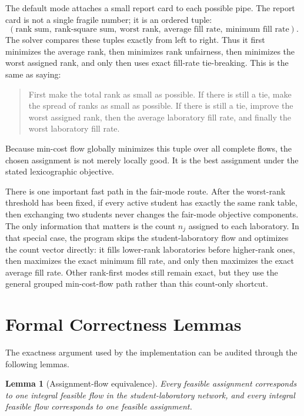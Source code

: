 \documentclass[11pt,a4paper]{article}
\newtheorem{lemma}{Lemma}
\begin{document}
The default mode attaches a small report card to each possible pipe.  The
report card is not a single fragile number; it is an ordered tuple:
\[
  (\text{rank sum},\ \text{rank-square sum},\ \text{worst rank},
  \ \text{average fill rate},\ \text{minimum fill rate}).
\]
The solver compares these tuples exactly from left to right.  Thus it first
minimizes the average rank, then minimizes rank unfairness, then minimizes the
worst assigned rank, and only then uses exact fill-rate tie-breaking.
This is the same as saying:
\begin{quote}
  First make the total rank as small as possible.  If there is still a tie,
  make the spread of ranks as small as possible.  If there is still a tie,
  improve the worst assigned rank, then the average laboratory fill rate, and
  finally the worst laboratory fill rate.
\end{quote}
Because min-cost flow globally minimizes this tuple over all complete flows,
the chosen assignment is not merely locally good.  It is the best assignment
under the stated lexicographic objective.

There is one important fast path in the fair-mode route.  After the worst-rank
threshold has been fixed, if every active student has exactly the same rank
table, then exchanging two students never changes the fair-mode objective
components.  The only information that matters is the count \(n_j\) assigned
to each laboratory.  In that special case, the program skips the
student-laboratory flow and optimizes the count vector directly: it fills
lower-rank laboratories before higher-rank ones, then maximizes the exact
minimum fill rate, and only then maximizes the exact average fill rate.  Other
rank-first modes still remain exact, but they use the general grouped
min-cost-flow path rather than this count-only shortcut.

\section{Formal Correctness Lemmas}

The exactness argument used by the implementation can be audited through the
following lemmas.

\begin{lemma}[Assignment-flow equivalence]
Every feasible assignment corresponds to one integral feasible flow in the
student-laboratory network, and every integral feasible flow corresponds to
one feasible assignment.
\end{lemma}
\end{document}
